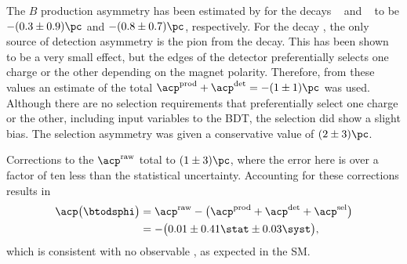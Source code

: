 The $B$ production asymmetry has been estimated by \lhcb for the decays
\decay{\Bp}{\jpsi\pip}~\cite{LHCb-PAPER-2011-024} and
\decay{\Bp}{\Dz\Kp}~\cite{LHCb-PAPER-2012-001} to be
$-(0.3\pm0.9)\pc$ and $-(0.8\pm0.7)\pc$, respectively.
For the decay \btodsphi, the only source of detection asymmetry is the pion from the \Ds decay.
This has been shown to be a very small effect, but the edges of the detector preferentially selects
one charge or the other depending on the magnet polarity.
Therefore, from these values an estimate of the total $\acp^\mathrm{prod} + \acp^\mathrm{det}=-(1\pm1)\pc$
was used.
Although there are no selection requirements that preferentially select one charge or the other,
including input variables to the BDT, the selection did show a slight bias.
The selection asymmetry was given a conservative value of $(2\pm3)\pc$.

Corrections to the $\acp^\mathrm{raw}$ total to $(1\pm3)\pc$, where the error here is over a factor
of ten less than the statistical uncertainty.
Accounting for these corrections results in
\begin{align}
  \acp\big(\btodsphi\big)&=
  \acp^\mathrm{raw} - \big(\acp^\mathrm{prod} + \acp^\mathrm{det} +
  \acp^\mathrm{sel}\big)\nonumber\\
  &=
  -\big(0.01\pm0.41\stat\pm0.03\syst\big),
\end{align}
which is consistent with no observable \CPV, as expected in the SM.



